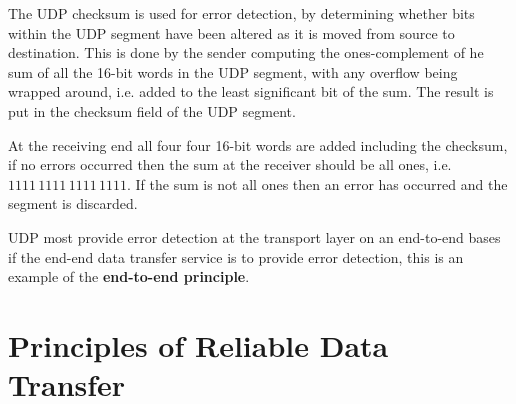 \documentclass[12pt letter]{report}
\begin{document}
The UDP checksum is used for error detection, by determining whether
bits within the UDP segment have been altered as it is moved from
source to destination. This is done by the sender computing the
ones-complement of he sum of all the 16-bit words in the UDP segment,
with any overflow being wrapped around, i.e. added to the least
significant bit of the sum. The result is put in the checksum field
of the UDP segment.

At the receiving end all four four 16-bit words are added including
the checksum, if no errors occurred then the sum at the receiver
should be all ones, i.e. $1111 \,1111 \,1111 \,1111$. If the sum is
not all ones then an error has occurred and the segment is discarded.


UDP most provide error detection at the transport layer on an
end-to-end bases if the end-end data transfer service is to provide
error detection, this is an example of the \textbf{end-to-end principle}.

\chapter{Principles of Reliable Data Transfer}
\end{document}
